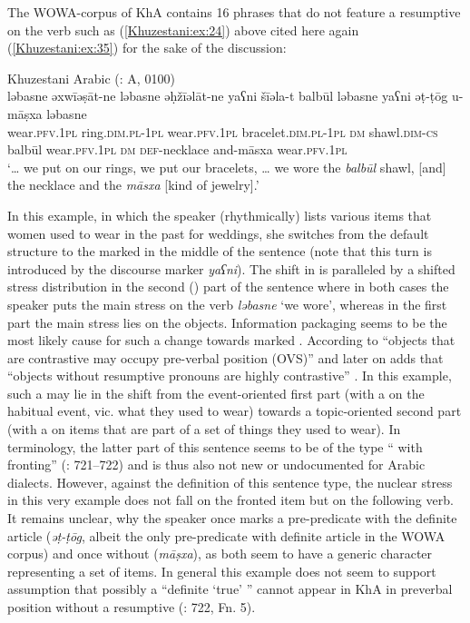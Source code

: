 \documentclass[output=paper,colorlinks,citecolor=brown,draftmode]{langscibook}
\begin{document}
The WOWA-corpus of KhA contains 16  phrases that do not feature a resumptive  on the verb such as (\ref{Khuzestani:ex:24}) above cited here again (\ref{Khuzestani:ex:35}) for the sake of the discussion:

\ea\label{Khuzestani:ex:35}
Khuzestani Arabic (\citealt{leitnerArabic2021}: A, 0100) \\
\gll ləbasne əxwīəṣāt-ne ləbasne əḥžīəlāt-ne yaʕni šīəla-t balbūl ləbasne yaʕni əṭ-ṭōg u-māṣxa ləbasne \\
wear\textsc{.pfv.1pl} ring\textsc{.dim.pl-1pl} wear\textsc{.pfv.1pl} bracelet\textsc{.dim.pl-1pl} \textsc{dm} shawl\textsc{.dim-cs} balbūl wear\textsc{.pfv.1pl} \textsc{dm} \textsc{def-}necklace and-māsxa wear\textsc{.pfv.1pl} \\
\glt `… we put on our rings, we put our bracelets, … we wore the \textit{balbūl} shawl, [and] the necklace and the \textit{māsxa} [kind of jewelry].' 
\z

In this example, in which the speaker (rhythmically) lists various items that women used to wear in the past for weddings, she switches from the default  structure to the marked  in the middle of the sentence (note that this turn is introduced by the discourse marker \textit{yaʕni}). The shift in  is paralleled by a shifted stress distribution in the second () part of the sentence where in both cases the speaker puts the main stress on the verb \textit{ləbasne} `we wore', whereas in the first part the main stress lies on the objects. Information packaging seems to be the most likely cause for such a change towards marked . According to \citet[343]{brustad2000} ``objects that are contrastive may occupy pre-verbal position (OVS)'' and later on adds that ``objects without resumptive pronouns are highly contrastive'' \citep[348]{brustad2000}. In this example, such a  may lie in the shift from the event-oriented first part (with a  on the habitual event, vic. what they used to wear) towards a topic-oriented second part (with a  on items that are part of a set of things they used to wear). In  terminology, the latter part of this sentence seems to be of the type `` with  fronting'' (\citealt{ingham1991}: 721–722) and is thus also not new or undocumented for Arabic dialects. However, against the definition of this sentence type, the nuclear stress in this very example does not fall on the fronted item but on the following verb. It remains unclear, why the speaker once marks a pre-predicate  with the definite article (\textit{əṭ-ṭōg}, albeit the only pre-predicate  with definite article in the WOWA corpus) and once without (\textit{māṣxa}), as both seem to have a generic character representing a set of items. In general this example does not seem to support  assumption that possibly a ``definite `true' '' cannot appear in KhA in preverbal position without a resumptive  (\citealt{ingham1991}: 722, Fn. 5).
\end{document}
